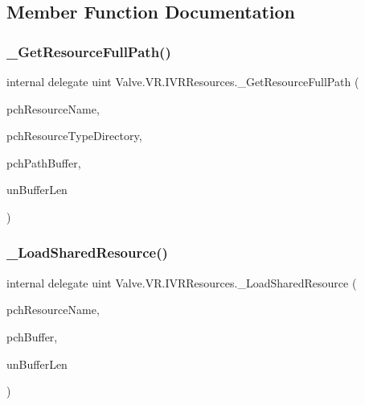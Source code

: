 \subsection{Member Function Documentation}
\mbox{\label{struct_valve_1_1_v_r_1_1_i_v_r_resources_a288dac70d54efc2dcbfdd73e66ead2a2}} 
\subsubsection{\texorpdfstring{\_GetResourceFullPath()}{\_GetResourceFullPath()}}
{\footnotesize\ttfamily internal delegate uint Valve.\+V\+R.\+I\+V\+R\+Resources.\+\_\+\+Get\+Resource\+Full\+Path (\begin{DoxyParamCaption}\item[{string}]{pch\+Resource\+Name,  }\item[{string}]{pch\+Resource\+Type\+Directory,  }\item[{System.\+Text.\+String\+Builder}]{pch\+Path\+Buffer,  }\item[{uint}]{un\+Buffer\+Len }\end{DoxyParamCaption})}

\mbox{\label{struct_valve_1_1_v_r_1_1_i_v_r_resources_a47884b57d0f09e94f051c25d7e05037e}} 
\subsubsection{\texorpdfstring{\_LoadSharedResource()}{\_LoadSharedResource()}}
{\footnotesize\ttfamily internal delegate uint Valve.\+V\+R.\+I\+V\+R\+Resources.\+\_\+\+Load\+Shared\+Resource (\begin{DoxyParamCaption}\item[{string}]{pch\+Resource\+Name,  }\item[{string}]{pch\+Buffer,  }\item[{uint}]{un\+Buffer\+Len }\end{DoxyParamCaption})}



